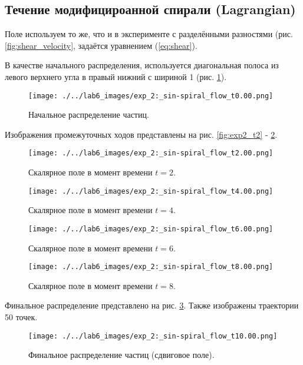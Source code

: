 \newpage
\subsection{Течение модифицироанной спирали (Lagrangian)}

Поле используем то же, что и в эксперименте с разделёнными разностями (рис. \ref{fig:shear_velocity},  задаётся уравнением (\ref{eq:shear}).

В качестве начального распределения, используется диагональная  полоса из левого верхнего угла в правый нижний  с шириной 1 (рис. \ref{fig:lg_shaer_begin}). 
\begin{figure}
	\centering
	\texttt{[image: ./../lab6\_images/exp\_2:\_sin-spiral\_flow\_t0.00.png]}
	\caption{Начальное распределение частиц.}
	\label{fig:lg_shaer_begin}
\end{figure}

Изображения промежуточных ходов представлены на рис. \ref{fig:exp2_t2} - \ref{fig:exp2_t8}.

\begin{figure}
	\centering
	\begin{minipage}[b]{0.48\textwidth}
		\centering
		\texttt{[image: ./../lab6\_images/exp\_2:\_sin-spiral\_flow\_t2.00.png]}
		\caption{Скалярное поле в момент времени $t=2$.}
		\label{fig:exp2_t2}
	\end{minipage}
	\hfill
	\begin{minipage}[b]{0.48\textwidth}
		\centering
		\texttt{[image: ./../lab6\_images/exp\_2:\_sin-spiral\_flow\_t4.00.png]}
		\caption{Скалярное поле в момент времени $t=4$.}
	\end{minipage}
	\vspace{0.5cm}
	
	\begin{minipage}[b]{0.48\textwidth}
		\centering
		\texttt{[image: ./../lab6\_images/exp\_2:\_sin-spiral\_flow\_t6.00.png]}
		\caption{Скалярное поле в момент времени $t=6$.}
	\end{minipage}
	\hfill
	\begin{minipage}[b]{0.48\textwidth}
		\centering
		\texttt{[image: ./../lab6\_images/exp\_2:\_sin-spiral\_flow\_t8.00.png]}
		\caption{Скалярное поле в момент времени $t=8$.}
				\label{fig:exp2_t8}
	\end{minipage}
\end{figure}

\newpage
Финальное распределение представлено на рис. \ref{fig:lg_shaer_finall}. Также изображены траектории 50 точек.
\begin{figure}
	\centering
	\texttt{[image: ./../lab6\_images/exp\_2:\_sin-spiral\_flow\_t10.00.png]}
	\caption{Финальное распределение частиц (сдвиговое поле).}
	\label{fig:lg_shaer_finall}
\end{figure}

